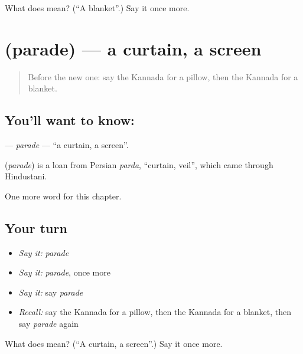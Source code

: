 \begin{tcolorbox}[breakable,colback=teal!4,colframe=teal!35!black,title={Before you move on}]
What does  mean? (\textquotedblleft{}A blanket\textquotedblright{}.) Say it once more.
\end{tcolorbox}
\section[\texorpdfstring{\kn{ಪರದೆ} (parade)}{ಪರದೆ (parade)}]{ (parade) — a curtain, a screen}

\label{lesson:KA-C116-parade}



\begin{quote}
Before the new one: say the Kannada for a pillow, then the Kannada for a blanket.
\end{quote}

\subsection*{You'll want to know: }
\textbf{} — \emph{parade} — \textquotedblleft{}a curtain, a screen\textquotedblright{}.

\begin{cousinweb}
\textbf{} (\emph{parade}) is a loan from Persian \emph{parda}, \textquotedblleft{}curtain, veil\textquotedblright{}, which came through Hindustani.
\end{cousinweb}

\begin{grammarlens}[title={What you've built}]
One more word for this chapter.
\end{grammarlens}

\subsection*{Your turn}
\begin{itemize}
\raggedright
  \item \emph{Say it:} \emph{parade}
  \item \emph{Say it:} \emph{parade}, once more
  \item \emph{Say it:} say \emph{parade}
  \item \emph{Recall:} say the Kannada for a pillow, then the Kannada for a blanket, then say \emph{parade} again
\end{itemize}

\begin{tcolorbox}[breakable,colback=teal!4,colframe=teal!35!black,title={Before you move on}]
What does  mean? (\textquotedblleft{}A curtain, a screen\textquotedblright{}.) Say it once more.
\end{tcolorbox}
